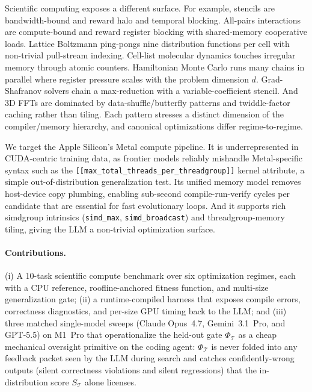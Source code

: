 \documentclass{article}
\theoremstyle{plain}
\theoremstyle{definition}
\theoremstyle{remark}
\begin{document}
Scientific computing exposes a different surface. For example, stencils are
bandwidth-bound and reward halo and temporal blocking. All-pairs
interactions are compute-bound and reward register blocking with
shared-memory cooperative loads. Lattice Boltzmann ping-pongs nine
distribution functions per cell with non-trivial pull-stream indexing.
Cell-list molecular dynamics touches irregular memory through atomic
counters. Hamiltonian Monte Carlo runs many chains in parallel where
register pressure scales with the problem dimension $d$. Grad-Shafranov
solvers chain a max-reduction with a variable-coefficient stencil. And 3D
FFTs are dominated by data-shuffle/butterfly patterns and twiddle-factor
caching rather than tiling. Each pattern stresses a distinct dimension of
the compiler/memory hierarchy, and canonical optimizations \cite{datta,nyland2007fast,schonherr2011multi,anderson2008general,govindaraju2008high} differ regime-to-regime.

We target the Apple Silicon's Metal compute pipeline. It is underrepresented
in CUDA-centric training data, as frontier models reliably mishandle
Metal-specific syntax such as the
\texttt{[[max\_total\_threads\_per\_threadgroup]]} kernel attribute, a simple
out-of-distribution generalization test. Its unified memory model removes
host-device copy plumbing, enabling sub-second compile-run-verify cycles
per candidate that are essential for fast evolutionary loops. And it
supports rich simdgroup intrinsics (\texttt{simd\_max},
\texttt{simd\_broadcast}) and threadgroup-memory tiling, giving the LLM a
non-trivial optimization surface.

\paragraph{Contributions.} (i) A 10-task scientific compute benchmark over
six optimization regimes, each with a CPU reference, roofline-anchored
fitness function, and multi-size generalization gate; (ii) a runtime-compiled harness that exposes compile errors, correctness diagnostics, and per-size GPU timing back to the LLM; and (iii) three matched single-model sweeps (Claude Opus~4.7, Gemini~3.1~Pro, and GPT-5.5) on M1~Pro that operationalize the held-out gate $\Phi_\mathcal{T}$ as a cheap mechanical oversight primitive on the coding agent: $\Phi_\mathcal{T}$ is never folded into any feedback packet seen by the LLM during search and catches confidently-wrong outputs (silent correctness violations and silent regressions) that the in-distribution score $S_\mathcal{T}$ alone licenses.
\end{document}
